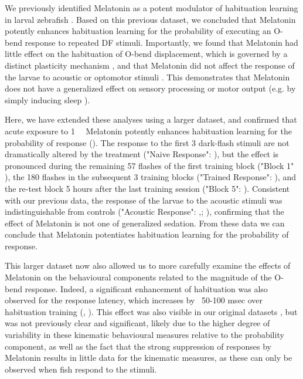 \documentclass[9.5pt]{RandlettLab_elife}            %
\begin{document}
We previously identified Melatonin as a potent modulator of habituation learning in larval zebrafish \citep{Lamire2023-he}.
Based on this previous dataset, we concluded that Melatonin potently enhances habituation learning for the probability of executing an O-bend response to repeated DF stimuli.
Importantly, we found that Melatonin had little effect on the habituation of O-bend displacement, which is governed by a distinct plasticity mechanism \citep{Randlett2019-fj}, and that Melatonin did not affect the response of the larvae to acoustic or optomotor stimuli \citep{Lamire2023-he}. 
This demonstrates that Melatonin does not have a generalized effect on sensory processing or motor output (e.g. by simply inducing sleep \citealp{Gandhi2015_NEURON, Hill2026}). 

Here, we have extended these analyses using a larger dataset, and confirmed that acute exposure to \SI{1}{\micro\Molar} Melatonin potently enhances habituation learning for the probability of response (). 
The response to the first 3 dark-flash stimuli are not dramatically altered by the treatment ("Naive Response": ), but the effect is pronounced during the remaining 57 flashes of the first training block ("Block 1" ), the 180 flashes in the subsequent 3 training blocks ("Trained Response": ), and the re-test block 5 hours after the last training session ("Block 5": ). 
Consistent with our previous data, the response of the larvae to the acoustic stimuli was indistinguishable from controls ("Acoustic Response": ,; \citealp{Lamire2023-he}), confirming that the effect of Melatonin is not one of generalized sedation. 
From these data we can conclude that Melatonin potentiates habituation learning for the probability of response.

This larger dataset now also allowed us to more carefully examine the effects of Melatonin on the behavioural components related to the magnitude of the O-bend response. Indeed, a significant enhancement of habituation was also observed for the response latency, which increases by ~50-100 msec over habituation training (, ). 
This effect was also visible in our original datasets \citep{Lamire2023-he}, but was not previously clear and significant, likely due to the higher degree of variability in these kinematic behavioural measures relative to the probability component, as well as the fact that the strong suppression of responses by Melatonin results in little data for the kinematic measures, as these can only be observed when fish respond to the stimuli. 
\end{document}
